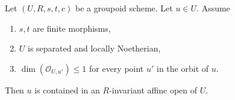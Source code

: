 %
\begin{lemma}
\label{lemma-find-affine-codimension-1}
Let $(U, R, s, t, c)$ be a groupoid scheme. Let $u \in U$. Assume
\begin{enumerate}
\item $s, t$ are finite morphisms,
\item $U$ is separated and locally Noetherian,
\item $\dim(\mathcal{O}_{U, u'}) \leq 1$ for every point $u'$
in the orbit of $u$.
\end{enumerate}
Then $u$ is contained in an $R$-invariant affine open of $U$.
\end{lemma}

